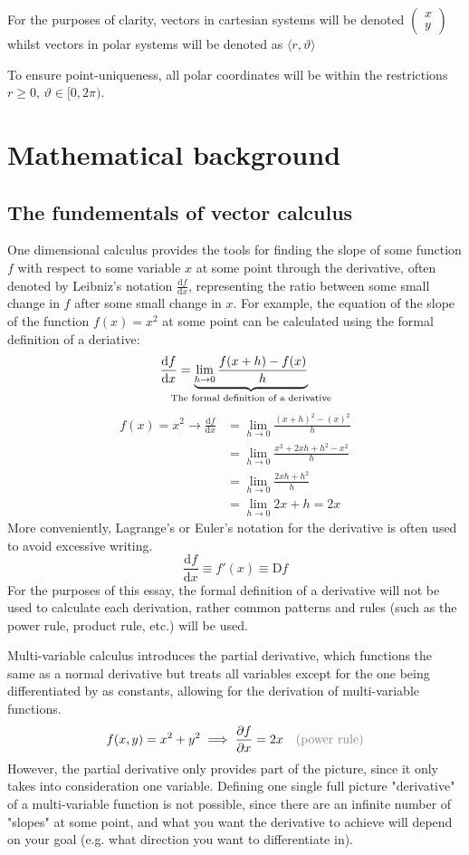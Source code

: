 \documentclass[a4paper,12pt]{article}
\renewcommand{\theta}{\vartheta}      		%
\newcommand{\der}[2]{\frac{\mathrm{d} #1}{\mathrm{d} #2}}           %
\newcommand{\partialder}[2]{\frac{\partial #1}{\partial #2}}        %
\newcommand{\justify}[1]{\text{\color{gray}(#1)}} 								%
\begin{document}
For the purposes of clarity, vectors in cartesian systems will be denoted $\begin{pmatrix}x\\y\end{pmatrix}$ whilst vectors in polar systems will be denoted as $\langle r,\theta\rangle$

To ensure point-uniqueness, all polar coordinates will be within the restrictions $r\geq0,\,\theta\in[0,2\pi)$.

\section{Mathematical background}
\subsection{The fundementals of vector calculus}
One dimensional calculus provides the tools for finding the slope of some function $f$ with respect to some variable $x$ at some point through the derivative, often denoted by Leibniz's notation $\der{f}{x}$, representing the ratio between some small change in $f$ after some small change in $x$. For example, the equation of the slope of the function $f(x)=x^2$ at some point can be calculated using the formal definition of a deriative:
\begin{equation}
	\der{f}{x}=\underbrace{\lim_{h\rightarrow0}\frac{f(x+h)-f(x)}{h}}_\text{\hidewidth The formal definition of a derivative\hidewidth}\\
\end{equation}
\begin{align*}
	f(x)=x^2\rightarrow\der{f}{x}&=\lim_{h\rightarrow0}\frac{(x+h)^2-(x)^2}{h}\\
	&=\lim_{h\rightarrow0}\frac{x^2+2xh+h^2-x^2}{h}\\
	&=\lim_{h\rightarrow0}\frac{2xh+h^2}{h}\\
	&=\lim_{h\rightarrow0}2x+h=2x
\end{align*}
More conveniently, Lagrange's or Euler's notation for the derivative is often used to avoid excessive writing.
$$\der{f}{x}\equiv f'(x)\equiv \mathrm{D}f$$
For the purposes of this essay, the formal definition of a derivative will not be used to calculate each derivation, rather common patterns and rules (such as the power rule, product rule, etc.) will be used. 

Multi-variable calculus introduces the partial derivative, which functions the same as a normal derivative but treats all variables except for the one being differentiated by as constants, allowing for the derivation of multi-variable functions.
\begin{align*}
	f(x,y)=x^2+y^2\implies\partialder{f}{x}=2x && \justify{power rule}
\end{align*}
However, the partial derivative only provides part of the picture, since it only takes into consideration one variable. Defining one single full picture "derivative" of a multi-variable function is not possible, since there are an infinite number of "slopes" at some point, and what you want the derivative to achieve will depend on your goal (e.g. what direction you want to differentiate in).
\end{document}
